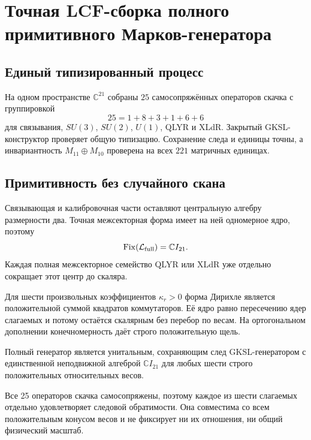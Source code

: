 \chapter{Точная LCF-сборка полного примитивного Марков-генератора}
\label{ch:v8-full-primitive-markov-generator-lcf-migration-gate}

\section{Единый типизированный процесс}

На одном пространстве $\mathbb C^{21}$ собраны $25$ самосопряжённых
операторов скачка с группировкой
\begin{equation}
 25=1+8+3+1+6+6
\end{equation}
для связывания, $SU(3)$, $SU(2)$, $U(1)$, QLYR и XLdR. Закрытый GKSL-
конструктор проверяет общую типизацию. Сохранение следа и единицы точны, а
инвариантность $M_{11}\oplus M_{10}$ проверена на всех $221$ матричных
единицах.

\section{Примитивность без случайного скана}

Связывающая и калибровочная части оставляют центральную алгебру размерности два.
Точная межсекторная форма имеет на ней одномерное ядро, поэтому
\begin{equation}
 \operatorname{Fix}(\mathcal L_{\rm full})=\mathbb CI_{21}.
\end{equation}
Каждая полная межсекторное семейство QLYR или XLdR уже отдельно сокращает этот центр до
скаляра.

Для шести произвольных коэффициентов $\kappa_r>0$ форма Дирихле является
положительной суммой квадратов коммутаторов. Её ядро равно пересечению ядер
слагаемых и потому остаётся скалярным без перебор по весам. На ортогональном
дополнении конечномерность даёт строго положительную щель.

\begin{theorem}
Полный генератор является унитальным, сохраняющим след GKSL-генератором с
единственной неподвижной алгеброй $\mathbb CI_{21}$ для любых шести строго
положительных относительных весов.
\end{theorem}

\begin{nogocriterion}
Все 25 операторов скачка самосопряжены, поэтому каждое из шести слагаемых
отдельно удовлетворяет следовой обратимости. Она совместима со всем
положительным конусом весов и не фиксирует ни их отношения, ни общий
физический масштаб.
\end{nogocriterion}

